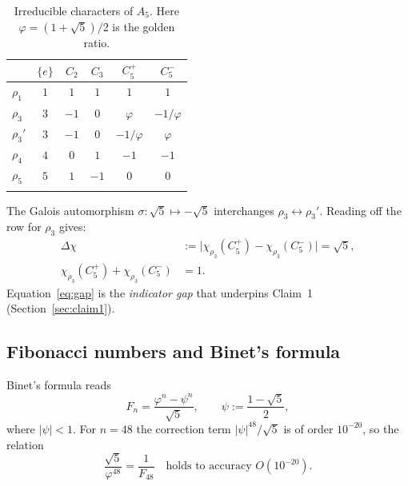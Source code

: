 \documentclass[sn-mathphys-num,Numbered]{sn-jnl}
\theoremstyle{thmstyleone}
\theoremstyle{thmstylethree}
\theoremstyle{thmstyletwo}
\begin{document}
\begin{table}[h]
\caption{Irreducible characters of $A_5$.
Here $\varphi = (1+\sqrt{5})/2$ is the golden ratio.}
\label{tab:characters}
\begin{tabular}{@{}lccccc@{}}
\toprule
 & $\{e\}$ & $C_2$ & $C_3$ & $C_5^+$ & $C_5^-$ \\
\midrule
$\rho_1$ & $1$  & $1$  & $1$  & $1$           & $1$ \\
$\rho_3$ & $3$  & $-1$ & $0$  & $\varphi$     & $-1/\varphi$ \\
$\rho_3'$& $3$  & $-1$ & $0$  & $-1/\varphi$  & $\varphi$ \\
$\rho_4$ & $4$  & $0$  & $1$  & $-1$          & $-1$ \\
$\rho_5$ & $5$  & $1$  & $-1$ & $0$           & $0$ \\
\botrule
\end{tabular}
\end{table}

The Galois automorphism $\sigma\colon\sqrt{5}\mapsto -\sqrt{5}$
interchanges $\rho_3 \leftrightarrow \rho_3'$. Reading off the row for
$\rho_3$ gives:
\begin{align}
  \Delta\chi &:= \bigl|\chi_{\rho_3}(C_5^+) - \chi_{\rho_3}(C_5^-)\bigr|
               = \sqrt{5}, \label{eq:gap} \\
  \chi_{\rho_3}(C_5^+) + \chi_{\rho_3}(C_5^-) &= 1. \label{eq:sum}
\end{align}
Equation~\eqref{eq:gap} is the \emph{indicator gap} that underpins
Claim~1 (Section~\ref{sec:claim1}).

\subsection{Fibonacci numbers and Binet's formula}
\label{ssec:fibonacci}

Binet's formula reads
\begin{equation}
  F_n = \frac{\varphi^n - \psi^n}{\sqrt{5}},
  \qquad \psi := \frac{1-\sqrt{5}}{2},
  \label{eq:binet}
\end{equation}
where $|\psi| < 1$. For $n = 48$ the correction term $|\psi|^{48}/\sqrt{5}$
is of order $10^{-20}$, so the relation
\begin{equation}
  \frac{\sqrt{5}}{\varphi^{48}} = \frac{1}{F_{48}}
  \quad \text{holds to accuracy } O(10^{-20}).
  \label{eq:binet-48}
\end{equation}
\end{document}

